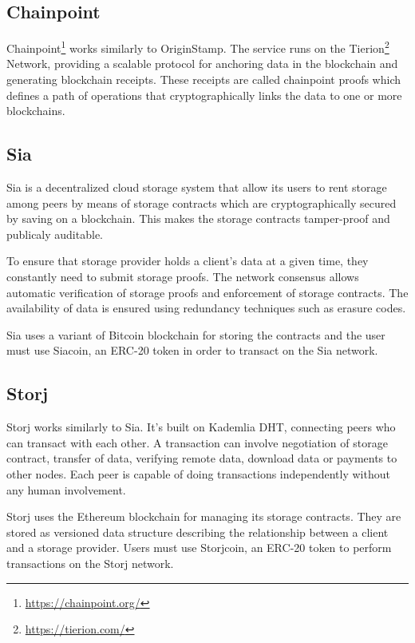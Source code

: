 \documentclass[]{article}
\begin{document}
		\subsection{Chainpoint}
			Chainpoint\footnote{\url{https://chainpoint.org/}} works similarly to OriginStamp. The service runs on the Tierion\footnote{\url{https://tierion.com/}} Network, providing a scalable protocol for anchoring data in the blockchain and generating blockchain receipts. These receipts are called chainpoint proofs which defines a path of operations that cryptographically links the data to one or more blockchains.
			
		\subsection{Sia}
			Sia\cite{vorick2014sia} is a decentralized cloud storage system that allow its users to rent storage among peers by means of storage contracts which are cryptographically secured by saving on a blockchain. This makes the storage contracts tamper-proof and publicaly auditable.
			
			To ensure that storage provider holds a client’s data at a given time, they constantly need to submit storage proofs. The network consensus allows automatic verification of storage proofs and enforcement of storage contracts. The availability of data is ensured using redundancy techniques such as erasure codes.
			
			Sia uses a variant of Bitcoin blockchain for storing the contracts and the user must use Siacoin, an ERC-20 token in order to transact on the Sia network.
		
		\subsection{Storj}
			Storj\cite{wilkinson2014storj} works similarly to Sia. It's built on Kademlia DHT, connecting peers who can transact with each other. A transaction can involve negotiation of storage contract, transfer of data, verifying remote data, download data or payments to other nodes. Each peer is capable of doing transactions independently without any human involvement.
			
			Storj uses the Ethereum blockchain for managing its storage contracts. They are stored as versioned data structure describing the relationship between a client and a storage provider. Users must use Storjcoin, an ERC-20 token to perform transactions on the Storj network. 
		
\end{document}
